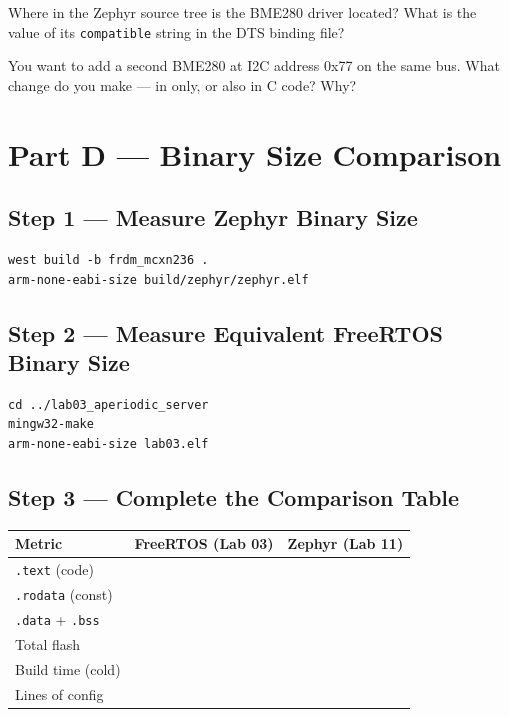 \documentclass[11pt, a4paper]{article}
\begin{document}
\begin{questionbox}[~C1]
  Where in the Zephyr source tree is the BME280 driver located? What is the value of
  its \texttt{compatible} string in the DTS binding file?
\end{questionbox}

\begin{questionbox}[~C2]
  You want to add a second BME280 at I2C address 0x77 on the same bus. What change do
  you make --- in  only, or also in C code? Why?
\end{questionbox}

\section{Part D --- Binary Size Comparison}

\subsection{Step 1 --- Measure Zephyr Binary Size}

\begin{lstlisting}[style=bashstyle]
west build -b frdm_mcxn236 .
arm-none-eabi-size build/zephyr/zephyr.elf
\end{lstlisting}

\subsection{Step 2 --- Measure Equivalent FreeRTOS Binary Size}

\begin{lstlisting}[style=bashstyle]
cd ../lab03_aperiodic_server
mingw32-make
arm-none-eabi-size lab03.elf
\end{lstlisting}

\subsection{Step 3 --- Complete the Comparison Table}

\renewcommand{\arraystretch}{1.3}
\begin{tabular}{@{} p{4cm} p{3.5cm} p{3.5cm} @{}}
  \toprule
  \textbf{Metric} & \textbf{FreeRTOS (Lab 03)} & \textbf{Zephyr (Lab 11)} \\
  \midrule
  \texttt{.text} (code)          & & \\
  \texttt{.rodata} (const)       & & \\
  \texttt{.data} + \texttt{.bss} & & \\
  Total flash                    & & \\
  Build time (cold)              & & \\
  Lines of config                & & \\
  \bottomrule
\end{tabular}
\renewcommand{\arraystretch}{1}
\end{document}
